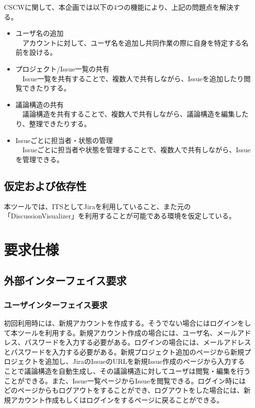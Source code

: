 \documentclass[12pt, oneside]{jreport}
\begin{document}
	CSCWに関して、本企画では以下の4つの機能により、上記の問題点を解決する。
	\begin{itemize}
		\item ユーザ名の追加
		\\
		　アカウントに対して、ユーザ名を追加し共同作業の際に自身を特定する名前を設ける。
		\item プロジェクト/Issue一覧の共有
		\\
		　Issue一覧を共有することで、複数人で共有しながら、Issueを追加したり閲覧できたりする。
		\item 議論構造の共有
		\\
		　議論構造を共有することで、複数人で共有しながら、議論構造を編集したり、整理できたりする。
		\item Issueごとに担当者・状態の管理
		\\
		　Issueごとに担当者や状態を管理することで、複数人で共有しながら、Issueを管理できる。
	\end{itemize}

	\section{仮定および依存性}
	本ツールでは、ITSとしてJiraを利用していること、また元の「DiscussionVisualizer」を利用することが可能である環境を仮定している。

\chapter{要求仕様}

	\section{外部インターフェイス要求}
		
		\subsection{ユーザインターフェイス要求}
		初回利用時には、新規アカウントを作成する。そうでない場合にはログインをして本ツールを利用する。新規アカウント作成の場合には、ユーザ名、メールアドレス、パスワードを入力する必要がある。ログインの場合には、メールアドレスとパスワードを入力する必要がある。新規プロジェクト追加のページから新規プロジェクトを追加し、JiraのIssueのURLを新規Issue作成のページから入力することで議論構造を自動生成し、その議論構造に対してユーザは閲覧・編集を行うことができる。また、Issue一覧ページからIssueを閲覧できる。ログイン時にはどのページからもログアウトをすることができ、ログアウトをした場合には、新規アカウント作成もしくはログインをするページに戻ることができる。
	
\end{document}
